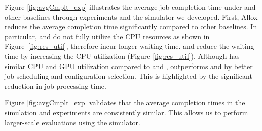 Figure \ref{fig:avgCmplt_exp} illustrates the average job completion time
under \name and other baselines through experiments and the simulator we developed. 
First, Allox reduces the average completion time significantly compared to other baselines. In particular, \DRFFIFO and \DRFSJF do not fully utilize the CPU resources as shown in Figure~\ref{fig:res_util}, therefore incur longer waiting time. 
\ESRP and \DRFExt reduce the waiting time by increasing the CPU utilization (Figure \ref{fig:res_util}).
Although \name has similar CPU and GPU utilization compared to \DRFExt and \ESRP, \name outperforms \DRFExt and \ESRP by better job scheduling and configuration selection. This is highlighted by the significant reduction in job processing time. 






Figure \ref{fig:avgCmplt_exp} validates that the average completion times in the simulation and experiments are consistently similar.
This allows us to perform larger-scale evaluations using the simulator.%

